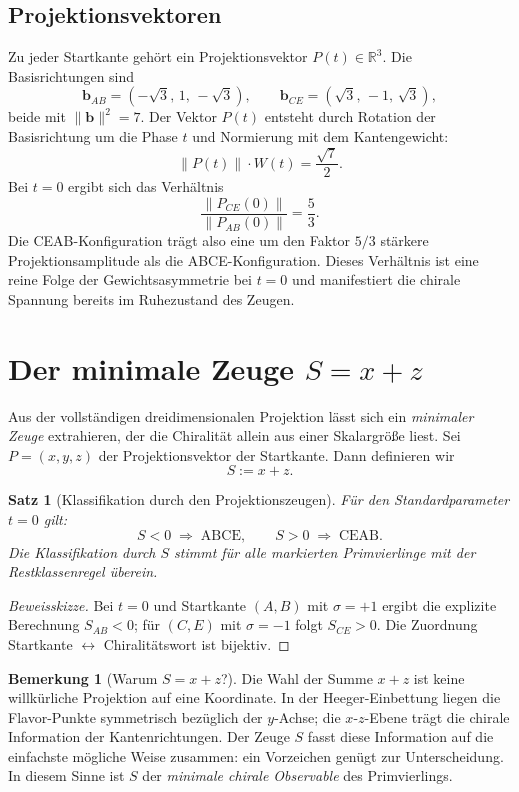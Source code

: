\documentclass[11pt,a4paper]{article}
\theoremstyle{definition}
\newtheorem{bemerkung}[definition]{Bemerkung}
\theoremstyle{plain}
\newtheorem{satz}[definition]{Satz}
\newcommand{\R}{\mathbb{R}}
\begin{document}
	\subsection{Projektionsvektoren}
	
	Zu jeder Startkante gehört ein Projektionsvektor $P(t)\in\R^3$. Die Basisrichtungen sind
	\[
	\mathbf{b}_{AB}=(-\sqrt{3},\,1,\,-\sqrt{3}),\qquad
	\mathbf{b}_{CE}=(\sqrt{3},\,-1,\,\sqrt{3}),
	\]
	beide mit $\|\mathbf{b}\|^2=7$. Der Vektor $P(t)$ entsteht durch Rotation der Basisrichtung um die Phase $t$ und Normierung mit dem Kantengewicht:
	\[
	\|P(t)\|\cdot W(t)=\frac{\sqrt{7}}{2}.
	\]
	Bei $t=0$ ergibt sich das Verhältnis
	\[
	\frac{\|P_{CE}(0)\|}{\|P_{AB}(0)\|}=\frac{5}{3}.
	\]
	Die CEAB-Konfiguration trägt also eine um den Faktor $5/3$ stärkere Projektionsamplitude als die ABCE-Konfiguration. Dieses Verhältnis ist eine reine Folge der Gewichtsasymmetrie bei $t=0$ und manifestiert die chirale Spannung bereits im Ruhezustand des Zeugen.
	
	\section{Der minimale Zeuge $S=x+z$}
	
	Aus der vollständigen dreidimensionalen Projektion lässt sich ein \emph{minimaler Zeuge} extrahieren, der die Chiralität allein aus einer Skalargröße liest. Sei $P=(x,y,z)$ der Projektionsvektor der Startkante. Dann definieren wir
	\[
	S:=x+z.
	\]
	
	\begin{satz}[Klassifikation durch den Projektionszeugen]
		Für den Standardparameter $t=0$ gilt:
		\[
		S<0\;\Longrightarrow\;\mathrm{ABCE},\qquad
		S>0\;\Longrightarrow\;\mathrm{CEAB}.
		\]
		Die Klassifikation durch $S$ stimmt für alle markierten Primvierlinge mit der Restklassenregel überein.
	\end{satz}
	
	\begin{proof}[Beweisskizze]
		Bei $t=0$ und Startkante $(A,B)$ mit $\sigma=+1$ ergibt die explizite Berechnung $S_{AB}<0$; für $(C,E)$ mit $\sigma=-1$ folgt $S_{CE}>0$. Die Zuordnung Startkante $\leftrightarrow$ Chiralitätswort ist bijektiv.
	\end{proof}
	
	\begin{bemerkung}[Warum $S=x+z$?]
		Die Wahl der Summe $x+z$ ist keine willkürliche Projektion auf eine Koordinate. In der Heeger-Einbettung liegen die Flavor-Punkte symmetrisch bezüglich der $y$-Achse; die $x$-$z$-Ebene trägt die chirale Information der Kantenrichtungen. Der Zeuge $S$ fasst diese Information auf die einfachste mögliche Weise zusammen: ein Vorzeichen genügt zur Unterscheidung. In diesem Sinne ist $S$ der \emph{minimale chirale Observable} des Primvierlings.
	\end{bemerkung}
	
\end{document}
